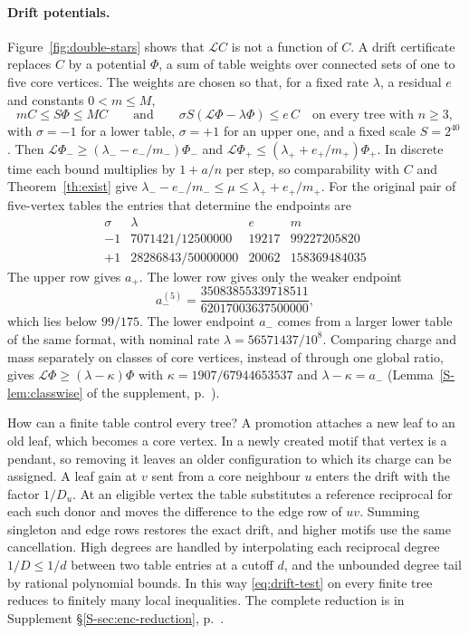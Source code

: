 \documentclass[11pt]{article}
\theoremstyle{remark}
\newcommand{\Sref}[1]{Supplement \S\ref{S-#1}, p.~\pageref{S-#1}}
\begin{document}
\paragraph{Drift potentials.} Figure~\ref{fig:double-stars} shows that $\mathcal LC$ is not a function of $C$. A drift certificate replaces $C$ by a potential $\Phi$, a sum of table weights over connected sets of one to five core vertices. The weights are chosen so that, for a fixed rate $\lambda$, a residual $e$ and constants $0<m\le M$,
\begin{equation}\label{eq:drift-test}
 mC\le S\Phi\le MC
 \qquad\text{and}\qquad
 \sigma S(\mathcal L\Phi-\lambda\Phi)\le e\,C
 \quad\text{on every tree with }n\ge3,
\end{equation}
with $\sigma=-1$ for a lower table, $\sigma=+1$ for an upper one, and a fixed scale $S=2^{40}$. Then $\mathcal L\Phi_-\ge(\lambda_--e_-/m_-)\Phi_-$ and $\mathcal L\Phi_+\le(\lambda_++e_+/m_+)\Phi_+$. In discrete time each bound multiplies by $1+a/n$ per step, so comparability with $C$ and Theorem~\ref{th:exist} give $\lambda_--e_-/m_-\le\mu\le\lambda_++e_+/m_+$. For the original pair of five-vertex tables the entries that determine the endpoints are
\[
\begin{array}{c|r|r|r}
 \sigma &\lambda&e&m\\ \hline
 -1&7071421/12500000&19217&99227205820\\
 +1&28286843/50000000&20062&158369484035
\end{array}
\]
The upper row gives $a_+$. The lower row gives only the weaker endpoint
\[
 a_-^{(5)}=\frac{35083855339718511}{62017003637500000},
\]
which lies below $99/175$. The lower endpoint $a_-$ comes from a larger lower table of the same format, with nominal rate $\lambda=56571437/10^8$. Comparing charge and mass separately on classes of core vertices, instead of through one global ratio, gives $\mathcal L\Phi\ge(\lambda-\kappa)\Phi$ with $\kappa=1907/67944653537$ and $\lambda-\kappa=a_-$ (Lemma~\ref{S-lem:classwise} of the supplement, p.~\pageref{S-lem:classwise}).

How can a finite table control every tree? A promotion attaches a new leaf to an old leaf, which becomes a core vertex. In a newly created motif that vertex is a pendant, so removing it leaves an older configuration to which its charge can be assigned. A leaf gain at $v$ sent from a core neighbour $u$ enters the drift with the factor $1/D_u$. At an eligible vertex the table substitutes a reference reciprocal for each such donor and moves the difference to the edge row of $uv$. Summing singleton and edge rows restores the exact drift, and higher motifs use the same cancellation. High degrees are handled by interpolating each reciprocal degree $1/D\le1/d$ between two table entries at a cutoff $d$, and the unbounded degree tail by rational polynomial bounds. In this way \eqref{eq:drift-test} on every finite tree reduces to finitely many local inequalities. The complete reduction is in \Sref{sec:enc-reduction}.
\end{document}
